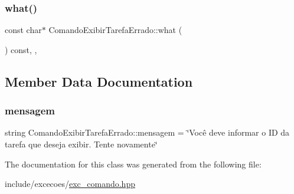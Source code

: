 \subsubsection{\texorpdfstring{what()}{what()}}
{\footnotesize\ttfamily const char$\ast$ Comando\+Exibir\+Tarefa\+Errado\+::what (\begin{DoxyParamCaption}{ }\end{DoxyParamCaption}) const\hspace{0.3cm}{\ttfamily [inline]}, {\ttfamily [override]}, {\ttfamily [noexcept]}}



\subsection{Member Data Documentation}
\mbox{\label{classComandoExibirTarefaErrado_ae5e55f9c70c2f3a187b86ecc32ca27dd}} 
\subsubsection{\texorpdfstring{mensagem}{mensagem}}
{\footnotesize\ttfamily string Comando\+Exibir\+Tarefa\+Errado\+::mensagem = \char`\"{}Você deve informar o ID da tarefa que deseja exibir. Tente novamente\char`\"{}\hspace{0.3cm}{\ttfamily [private]}}



The documentation for this class was generated from the following file\+:\begin{DoxyCompactItemize}
\item 
include/excecoes/\hyperlink{exc__comando_8hpp}{exc\+\_\+comando.\+hpp}\end{DoxyCompactItemize}
